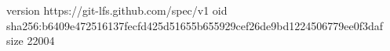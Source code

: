version https://git-lfs.github.com/spec/v1
oid sha256:b6409e472516137fecfd425d51655b655929cef26de9bd1224506779ee0f3daf
size 22004
